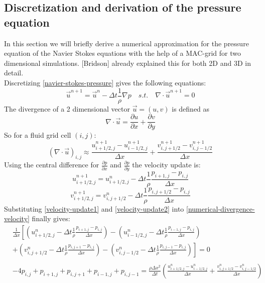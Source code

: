 \subsection{Discretization and derivation of the pressure equation}
In this section we will briefly derive a numerical approximation for the pressure equation of the Navier Stokes equations with the help of a MAC-grid for two dimensional simulations. [Bridson] already explained this for both 2D and 3D in detail.\\
Discretizing \ref{navier-stokes-pressure} gives the following equations:
\begin{equation} \label{navier-stokes-pressure-numerical1}
	\vec{u}^{n+1} = \vec{u}^{n} - \Delta t \frac{1}{\rho} \nabla p \quad s.t. \quad \nabla \cdot \vec{u}^{n+1} = 0
\end{equation}
The divergence of a 2 dimensional vector $\vec{u} = (u, v)$ is defined as
\begin{equation} \label{general-divergence}
	\nabla \cdot \vec{u} = \frac{\partial u}{\partial x} + \frac{\partial v}{\partial y}
\end{equation}
So for a fluid grid cell $(i, j)$:
\begin{equation} \label{numerical-divergence-velocity}
	(\nabla \cdot \vec{u})_{i,j} \approx \frac{u_{i+1/2,j}^{n+1} - u_{i-1/2,j}^{n+1}}{\Delta x} + \frac{v_{i,j+1/2}^{n+1} - v_{i,j-1/2}^{n+1}}{\Delta x}
\end{equation}
Using the central difference for $\frac{\partial p}{\partial x}$ and $\frac{\partial p}{\partial y}$ the velocity update is:
\begin{equation} \label{velocity-update1}
	u_{i+1/2,j}^{n+1} = u_{i+1/2,j}^{n} - \Delta t \frac{1}{\rho} \frac{p_{i+1,j} - p_{i,j}}{\Delta x}
\end{equation}
\begin{equation} \label{velocity-update2}
v_{i+1/2,j}^{n+1} = v_{i,j+1/2}^{n} - \Delta t \frac{1}{\rho} \frac{p_{i,j+1/2} - p_{i,j}}{\Delta x}
\end{equation}
Substituting \ref{velocity-update1} and \ref{velocity-update2} into \ref{numerical-divergence-velocity} finally gives:
\begin{equation} \label{pressure-equation}
	\begin{aligned}
		& \frac{1}{\Delta x}\left[\left(u_{i+1/2,j}^{n} - \Delta t \frac{1}{\rho} \frac{p_{i+1,j} - p_{i,j}}{\Delta x}\right) - \left(u_{i-1/2,j}^{n} - \Delta t \frac{1}{\rho} \frac{p_{i-1,j} - p_{i,j}}{\Delta x}\right) \right. \\
		& + \left. \left(v_{i,j+1/2}^{n} - \Delta t \frac{1}{\rho} \frac{p_{i,j+1} - p_{i,j}}{\Delta x}\right) - \left(v_{i,j-1/2}^{n} - \Delta t \frac{1}{\rho} \frac{p_{i,j-1} - p_{i,j}}{\Delta x} \right) \right] = 0 \\\\
		&  - 4p_{i,j} + p_{i+1,j} + p_{i,j+1} + p_{i-1,j} + p_{i,j-1} = \frac{\rho \Delta x^2}{\Delta t} \left( \frac{u_{i+1/2,j}^{n} - u_{i-1/2,j}^{n}}{\Delta x} + \frac{v_{i,j+1/2}^{n} - v_{i,j-1/2}^{n}}{\Delta x} \right)
\end{aligned}
\end{equation}
